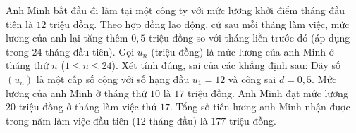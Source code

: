 \begin{ex}%
	Anh Minh bắt đầu đi làm tại một công ty với mức lương khởi điểm tháng đầu tiên là $12$ triệu đồng. Theo hợp đồng lao động, cứ sau mỗi tháng làm việc, mức lương của anh lại tăng thêm $0{,}5$ triệu đồng so với tháng liền trước đó (áp dụng trong $24$ tháng đầu tiên). Gọi $u_n$ (triệu đồng) là mức lương của anh Minh ở tháng thứ $n$ ($1 \le n \le 24$). Xét tính đúng, sai của các khẳng định sau:
	\choiceTF
	{\True Dãy số $(u_n)$ là một cấp số cộng với số hạng đầu $u_1 = 12$ và công sai $d = 0{,}5$.}
	{Mức lương của anh Minh ở tháng thứ $10$ là $17$ triệu đồng.}
	{\True Anh Minh đạt mức lương $20$ triệu đồng ở tháng làm việc thứ $17$.}
	{\True Tổng số tiền lương anh Minh nhận được trong năm làm việc đầu tiên ($12$ tháng đầu) là $177$ triệu đồng.}
\end{ex}
